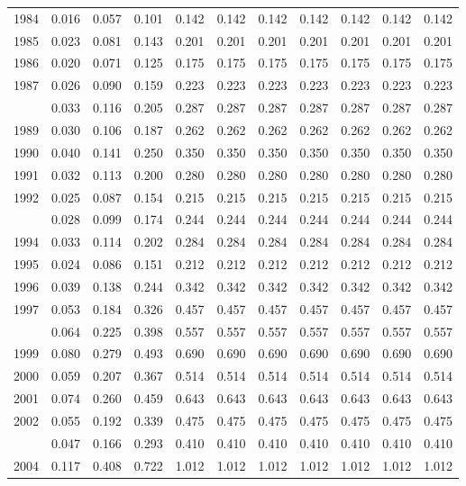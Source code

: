 \documentclass[
]{article}
\begin{document}
\begin{longtable}[t]{lrrrrrrrrrr}
1984 & 0.016 & 0.057 & 0.101 & 0.142 & 0.142 & 0.142 & 0.142 & 0.142 & 0.142 & 0.142\\
1985 & 0.023 & 0.081 & 0.143 & 0.201 & 0.201 & 0.201 & 0.201 & 0.201 & 0.201 & 0.201\\
1986 & 0.020 & 0.071 & 0.125 & 0.175 & 0.175 & 0.175 & 0.175 & 0.175 & 0.175 & 0.175\\
1987 & 0.026 & 0.090 & 0.159 & 0.223 & 0.223 & 0.223 & 0.223 & 0.223 & 0.223 & 0.223\\
\addlinespace
1988 & 0.033 & 0.116 & 0.205 & 0.287 & 0.287 & 0.287 & 0.287 & 0.287 & 0.287 & 0.287\\
1989 & 0.030 & 0.106 & 0.187 & 0.262 & 0.262 & 0.262 & 0.262 & 0.262 & 0.262 & 0.262\\
1990 & 0.040 & 0.141 & 0.250 & 0.350 & 0.350 & 0.350 & 0.350 & 0.350 & 0.350 & 0.350\\
1991 & 0.032 & 0.113 & 0.200 & 0.280 & 0.280 & 0.280 & 0.280 & 0.280 & 0.280 & 0.280\\
1992 & 0.025 & 0.087 & 0.154 & 0.215 & 0.215 & 0.215 & 0.215 & 0.215 & 0.215 & 0.215\\
\addlinespace
1993 & 0.028 & 0.099 & 0.174 & 0.244 & 0.244 & 0.244 & 0.244 & 0.244 & 0.244 & 0.244\\
1994 & 0.033 & 0.114 & 0.202 & 0.284 & 0.284 & 0.284 & 0.284 & 0.284 & 0.284 & 0.284\\
1995 & 0.024 & 0.086 & 0.151 & 0.212 & 0.212 & 0.212 & 0.212 & 0.212 & 0.212 & 0.212\\
1996 & 0.039 & 0.138 & 0.244 & 0.342 & 0.342 & 0.342 & 0.342 & 0.342 & 0.342 & 0.342\\
1997 & 0.053 & 0.184 & 0.326 & 0.457 & 0.457 & 0.457 & 0.457 & 0.457 & 0.457 & 0.457\\
\addlinespace
1998 & 0.064 & 0.225 & 0.398 & 0.557 & 0.557 & 0.557 & 0.557 & 0.557 & 0.557 & 0.557\\
1999 & 0.080 & 0.279 & 0.493 & 0.690 & 0.690 & 0.690 & 0.690 & 0.690 & 0.690 & 0.690\\
2000 & 0.059 & 0.207 & 0.367 & 0.514 & 0.514 & 0.514 & 0.514 & 0.514 & 0.514 & 0.514\\
2001 & 0.074 & 0.260 & 0.459 & 0.643 & 0.643 & 0.643 & 0.643 & 0.643 & 0.643 & 0.643\\
2002 & 0.055 & 0.192 & 0.339 & 0.475 & 0.475 & 0.475 & 0.475 & 0.475 & 0.475 & 0.475\\
\addlinespace
2003 & 0.047 & 0.166 & 0.293 & 0.410 & 0.410 & 0.410 & 0.410 & 0.410 & 0.410 & 0.410\\
2004 & 0.117 & 0.408 & 0.722 & 1.012 & 1.012 & 1.012 & 1.012 & 1.012 & 1.012 & 1.012\\

\end{longtable}
\end{document}
